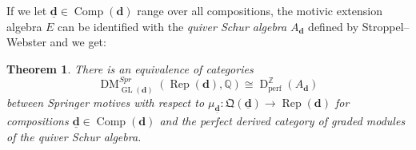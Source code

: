 \documentclass{amsart}
\theoremstyle{plain}
\newtheorem{theorem}{Theorem}[section]
\newtheorem{lemma}[theorem]{Lemma}
\theoremstyle{TheoremNum}
\theoremstyle{definition}
\theoremstyle{remark}
\numberwithin{equation}{section}
\newcommand{\Q}{\mathbb{Q}}
\newcommand{\Z}{\mathbb{Z}}
\newcommand{\QQ}{\mathfrak{Q}}
\newcommand{\DM}{\operatorname{DM}}
\newcommand{\DperfZ}{\operatorname{D}^\Z_{\operatorname{perf}}}
\newcommand{\Hom}{\operatorname{Hom}}
\newcommand{\GL}{\operatorname{GL}}
\newcommand{\Comp}{\operatorname{Comp}}
\newcommand{\Rep}{\operatorname{Rep}}
\begin{document}
If we let $\underline{\mathbf{d}}\in \Comp(\mathbf{d})$ range over all compositions, the  motivic extension algebra $E$ can be identified with the \emph{quiver Schur algebra} $A_{\mathbf{d}}$ defined by Stroppel--Webster \cite{stroppel_quiver_2014} and we get:
\begin{theorem}\label{thm:quiverschuralgebra} There is an equivalence of categories
$$\DM^{Spr}_{\GL(\mathbf{d})}(\Rep(\mathbf{d}),\Q)\cong \DperfZ(A_\mathbf{d})$$
between Springer motives with respect to $\mu_{\underline{\mathbf{d}}}:\QQ(\underline{\mathbf{d}})\to \Rep(\mathbf{d})$ for compositions $\underline{\mathbf{d}}\in \Comp(\mathbf{d})$ and the perfect derived category of graded modules of the quiver Schur algebra.
\end{theorem}

 

\end{document}

